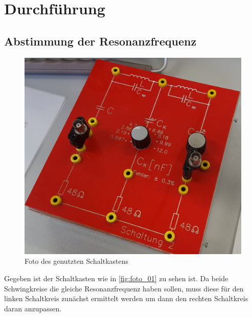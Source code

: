 \section{Durchführung}
\label{sec:Durchführung}


\subsection{Abstimmung der Resonanzfrequenz}
\label{sec:resonanz}

\begin{figure}
    \centering
    \includegraphics[width=\textwidth/2]{images/foto_01.png}
    \caption{Foto des genutzten Schaltkastens}
    \label{fig:foto_01}
\end{figure}
Gegeben ist der Schaltkasten wie in \autoref{fig:foto_01} zu sehen ist.
Da beide Schwingkreise die gleiche Resonanzfrequenz haben sollen, muss diese für den linken Schaltkreis zunächst ermittelt werden um dann den rechten Schaltkreis daran anzupassen.

